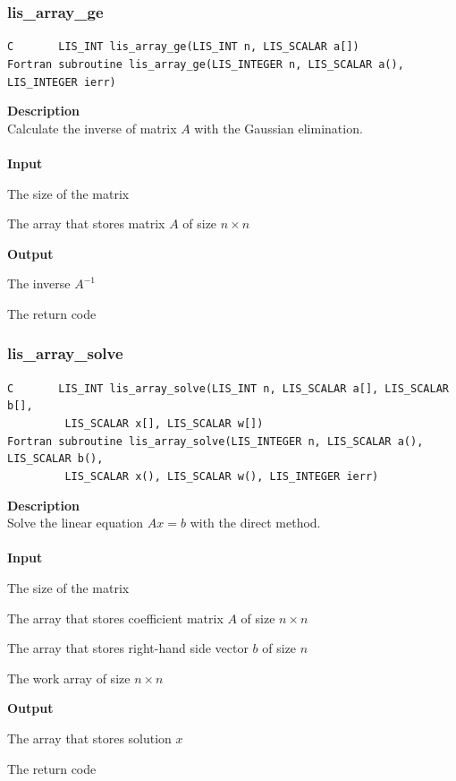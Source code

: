 \documentclass[a4paper]{article}
\newcommand{\namelistlabel}[1]{\mbox{#1}\hfill}
\newenvironment{namelist}[1]{%
\begin{list}{}
  {\let\makelabel\namelistlabel
  \settowidth{\labelwidth}{#1}
  \setlength{\leftmargin}{1.1\labelwidth}}
  }{%
\end{list}}
\begin{document}
\newpage
\subsubsection{lis\_array\_ge}
\begin{screen}
\verb|C       LIS_INT lis_array_ge(LIS_INT n, LIS_SCALAR a[])|\\
\verb|Fortran subroutine lis_array_ge(LIS_INTEGER n, LIS_SCALAR a(), LIS_INTEGER ierr)|
\end{screen}
{\bf Description}\\
\indent
Calculate the inverse of matrix $A$ with the Gaussian elimination.
\\ \\
\noindent
{\bf Input}
\begin{namelist}{XXXXXXXXXXXXXXXXXXXX}
\item[\tt n] The size of the matrix
\item[\tt a] The array that stores matrix $A$ of size $n \times n$
\end{namelist}
{\bf Output}
\begin{namelist}{XXXXXXXXXXXXXXXXXXXX}
\item[\tt a] The inverse $A^{-1}$
\item[\tt ierr] The return code
\end{namelist}

\subsubsection{lis\_array\_solve}
\begin{screen}
\verb|C       LIS_INT lis_array_solve(LIS_INT n, LIS_SCALAR a[], LIS_SCALAR b[],|\\
\verb|         LIS_SCALAR x[], LIS_SCALAR w[])|\\
\verb|Fortran subroutine lis_array_solve(LIS_INTEGER n, LIS_SCALAR a(), LIS_SCALAR b(),|\\
\verb|         LIS_SCALAR x(), LIS_SCALAR w(), LIS_INTEGER ierr)|
\end{screen}
{\bf Description}\\
\indent
Solve the linear equation $Ax = b$ with the direct method.
\\ \\
\noindent
{\bf Input}
\begin{namelist}{XXXXXXXXXXXXXXXXXXXX}
\item[\tt n] The size of the matrix
\item[\tt a] The array that stores coefficient matrix $A$ of size $n \times n$
\item[\tt b] The array that stores right-hand side vector $b$ of size $n$
\item[\tt w] The work array of size $n \times n$
\end{namelist}
{\bf Output}
\begin{namelist}{XXXXXXXXXXXXXXXXXXXX}
\item[\tt x] The array that stores solution $x$
\item[\tt ierr] The return code
\end{namelist}
\end{document}
